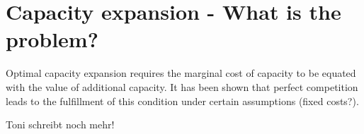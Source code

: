 \section{Capacity expansion - What is the problem?}

Optimal capacity expansion requires the marginal cost of capacity to be equated with the value of additional capacity. It has been shown that perfect competition leads to the fulfillment of this condition under certain assumptions (fixed costs?). 

\cite{Fehr1994}

Toni schreibt noch mehr!